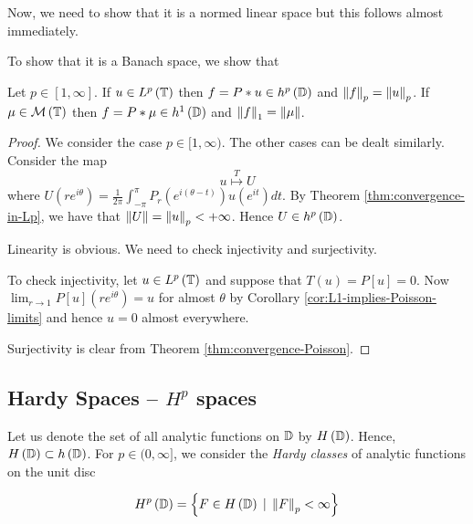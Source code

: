 Now, we need to show that it is a normed linear space but this follows almost immediately.

To show that it is a Banach space, we show that

\begin{theorem}
    Let $p\in [1, \infty]$. If $u\in L^{p} \left( \mathbb T \right)$ then $f=P * u \in h^{p} \left( \mathbb D \right)$ and $\left\lVert f \right\rVert_{p} =\left\lVert u \right\rVert_{p}$. If $\mu \in {\cal M} \left( \mathbb T \right)$ then $f= P * \mu \in h^{1} \left( \mathbb D \right)$ and $\left\lVert f \right\rVert_{1} = \left\lVert \mu \right\rVert$.
    \label{thm:lp-and-hp}
\end{theorem}
\begin{proof}
    We consider the case $p \in [1, \infty )$. The other cases can be dealt similarly. Consider the map 
    \begin{equation*}
	u \stackrel{T}{\mapsto} U
    \end{equation*}
    where $U\left( re^{i\theta} \right) = \frac{1}{2\pi} \int_{-\pi}^{\pi} P_{r}\left( e^{i(\theta-t)} \right) u \left( e^{it} \right) dt$. By Theorem \ref{thm:convergence-in-Lp}, we have that $\left\lVert U \right\rVert = \left\lVert u \right\rVert_{p} < +\infty$. Hence $U \in h^{p} \left( \mathbb D \right)$.

    Linearity is obvious. We need to check injectivity and surjectivity.

    To check injectivity, let $u \in L^{p} \left( \mathbb T \right)$ and suppose that $T(u)=P[u]=0$. Now $\lim_{r\to 1} P[u] \left( re^{i\theta} \right) = u$ for almost $\theta$ by Corollary \ref{cor:L1-implies-Poisson-limits} and hence $u=0$ almost everywhere.

    Surjectivity is clear from Theorem \ref{thm:convergence-Poisson}.
    \end{proof}


\subsection{Hardy Spaces -- \texorpdfstring{$H^p$}{} spaces}

Let us denote the set of all analytic functions on $\mathbb D$ by $H \left( \mathbb D \right)$. Hence, $H \left( \mathbb D \right) \subset h \left( \mathbb D \right)$. For $p\in (0,\infty]$, we consider the \textit{Hardy classes} of analytic functions on the unit disc

\begin{equation*}
    H^{p} \left( \mathbb D \right) = \left\{ F \in H \left( \mathbb D \right) \, \mid \, \left\lVert F \right\rVert _{p} < \infty \right\}
\end{equation*}

